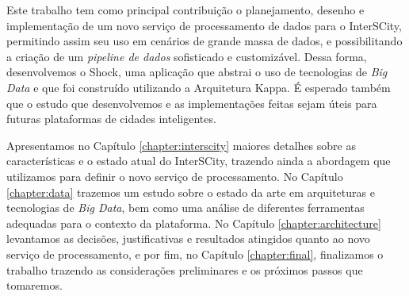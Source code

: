 Este trabalho tem como principal contribuição o planejamento, desenho e
implementação de um novo serviço de processamento de dados para o InterSCity,
permitindo assim seu uso em cenários de grande massa de dados, e possibilitando
a criação de um \textit{pipeline de dados} sofisticado e customizável. Dessa
forma, desenvolvemos o Shock, uma aplicação que abstrai o uso de tecnologias
de \textit{Big Data} e que foi construído utilizando a Arquitetura Kappa. É
esperado também que o estudo que desenvolvemos e as implementações feitas
sejam úteis para futuras plataformas de cidades inteligentes.

Apresentamos no Capítulo \ref{chapter:interscity} maiores detalhes sobre as
características e o estado atual do InterSCity, trazendo ainda a abordagem que
utilizamos para definir o novo serviço de processamento. No Capítulo
\ref{chapter:data} trazemos um estudo sobre o estado da arte em arquiteturas e
tecnologias de \textit{Big Data}, bem como uma análise de diferentes ferramentas
adequadas para o contexto da plataforma. No Capítulo \ref{chapter:architecture}
levantamos as decisões, justificativas e resultados atingidos quanto ao novo
serviço de processamento, e por fim, no Capítulo \ref{chapter:final},
finalizamos o trabalho trazendo as considerações preliminares e os próximos
passos que tomaremos.
